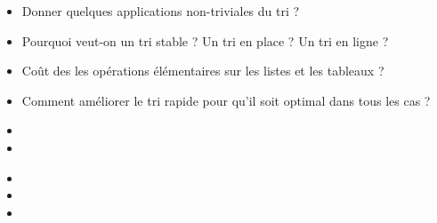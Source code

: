 \secquestionsclassiques

\begin{itemize}
    \item Donner quelques applications non-triviales du tri ?
    \item Pourquoi veut-on un tri stable ? Un tri en place ? Un tri en ligne ?
    \item Coût des les opérations élémentaires sur les listes et les tableaux ?
    \item Comment améliorer le tri rapide pour qu'il soit optimal dans tous les cas ?
\end{itemize}

\secreferences

\begin{itemize}
    \item 
    \item {}
\end{itemize}


\secdev

\begin{itemize}
    \item {}
    \item {}
    \item {}
\end{itemize}



